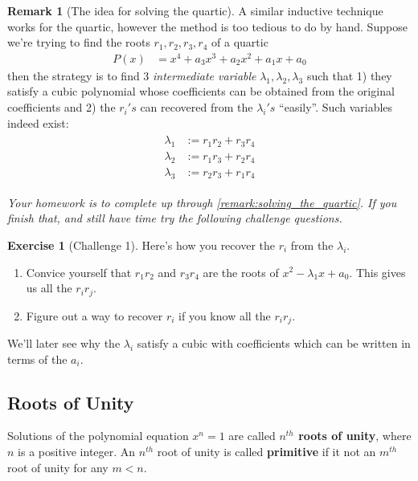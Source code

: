 \documentclass[reqno, 12pt, letter]{article}
\theoremstyle{plain}
\theoremstyle{definition}
\newtheorem{remark}[theorem]{Remark}
\newtheorem{exercise}[theorem]{Exercise}
\theoremstyle{remark}
\numberwithin{equation}{section}
\begin{document}
	\begin{remark}[The idea for solving the quartic]
		\label{remark:solving_the_quartic}
		A similar inductive technique works for the quartic, however the method is too tedious to do by hand. Suppose we're trying to find the roots $ r_1, r_2, r_3, r_4$ of a quartic \begin{align*}
			P(x) &= x^4 + a_3x^3 + a_2x^2 + a_1x + a_0
		\end{align*}
		then the strategy is to find 3 \emph{intermediate variable} $ \lambda_1, \lambda_2, \lambda_3$ such that 1) they satisfy a cubic polynomial whose coefficients can be obtained from the original coefficients and 2) the $r_i's$ can recovered from the $ \lambda_i's$ ``easily''. Such variables indeed exist:
			\begin{align}
				\label{equation:intermediate_variables_quartic}
				\begin{split}
					\lambda_1 &:= r_1 r_2 + r_3 r_4 \\
					\lambda_2 &:= r_1 r_3 + r_2 r_4 \\
					\lambda_3 &:= r_2 r_3 + r_1 r_4 
				\end{split}
			\end{align}
			
		{\it Your homework is to complete up through \autoref{remark:solving_the_quartic}. If you finish that, and still have time try the following challenge questions.}
			
		\begin{exercise}[Challenge 1]
			Here's how you recover the $ r_i$ from the $ \lambda_i$.
			\begin{enumerate}
				\item Convice yourself that $ r_1 r_2$ and $r_3 r_4$ are the roots of $ x^2 - \lambda_1 x + a_0$. This gives us all the $ r_i r_j$.
				\item Figure out a way to recover $ r_i$ if you know all the $ r_i r_j$.
			\end{enumerate}
		\end{exercise}
		We'll later see why the $ \lambda_i$ satisfy a cubic with coefficients which can be written in terms of the $ a_i$.
	\end{remark}
	
	
	
	
	
	
	\subsection{Roots of Unity}
		Solutions of the polynomial equation $ x^n = 1$ are called \textbf{$n^{th}$ roots of unity}, where $ n$ is a positive integer. An $ n^{th}$ root of unity is called \textbf{primitive} if it not an $ m^{th}$ root of unity for any $ m < n$.
	
\end{document}
